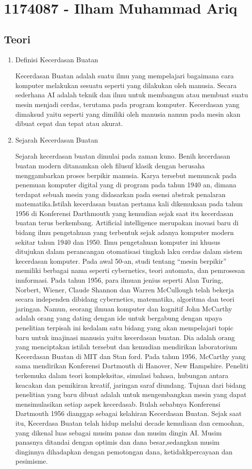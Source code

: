 \section{1174087 - Ilham Muhammad Ariq}
\subsection{Teori}
\begin{enumerate}
	\item Definisi Kecerdasan Buatan
		\par Kecerdasan Buatan adalah suatu ilmu yang mempelajari bagaimana cara komputer melakukan sesuatu seperti yang dilakukan oleh manusia. Secara sederhana AI adalah teknik dan ilmu untuk membangun atau membuat suatu mesin menjadi cerdas, terutama pada program komputer. Kecerdasan yang dimaksud yaitu seperti yang dimiliki oleh manusia namun pada mesin akan dibuat cepat dan tepat atau akurat.

\item Sejarah Kecerdasan Buatan
	\par Sejarah kecerdasan buatan dimulai pada zaman kuno. Benih kecerdasan buatan modern ditanamkan oleh filusuf klasik dengan berusaha menggambarkan proses berpikir manusia. Karya tersebut memuncak pada penemuan komputer digital yang di program pada tahun 1940 an, dimana terdapat sebuah mesin yang didasarkan pada esensi abstrak penalaran matematika.Istilah kecerdasan buatan pertama kali dikemukaan pada tahun 1956 di Konferensi Darthmouth yang kemudian sejak saat itu kecerdasan buatan terus berkembang. Artiﬁcial intelligence merupakan inovasi baru di bidang ilmu pengetahuan yang terbentuk sejak adanya komputer modern sekitar tahun 1940 dan 1950. Ilmu pengetahuan komputer ini khusus ditujukan dalam perancangan otomatisasi tingkah laku cerdas dalam sistem kecerdasan komputer. Pada awal 50-an, studi tentang “mesin berpikir” memiliki berbagai nama seperti cybernetics, teori automata, dan pemrosesan innformasi. Pada tahun 1956, para ilmuan jenius seperti Alan Turing, Norbert, Wiener, Claude Shannon dan Warren McCullough telah bekerja secara independen dibidang cybernetics, matematika, algoritma dan teori jaringan. Namun, seorang ilmuan komputer dan kognitif John McCarthy adalah orang yang dating dengan ide untuk bergabung dengan upaya penelitian terpisah ini kedalam satu bidang yang akan mempelajari topic baru untuk imajinasi manusia yaitu kecerdasan buatan. Dia adalah orang yang menciptakan istilah tersebut dan kemudian mendirikan laboratorium Kecerdasan Buatan di MIT dan Stan ford. Pada tahun 1956, McCarthy yang sama mendirikan Konferensi Dartmouth di Hanover, New Hampshire. Peneliti terkemuka dalam teori kompleksitas, simulasi bahasa, hubungan antara keacakan dan pemikiran kreatif, jaringan saraf diundang. Tujuan dari bidang penelitian yang baru dibuat adalah untuk mengembangkan mesin yang dapat mensimulasikan setiap aspek kecerdasab. Itulah sebabnya Konferensi Dartmouth 1956 dianggap sebagai kelahiran Kecerdasan Buatan. Sejak saat itu, Kecerdasa Buatan telah hidup melalui decade kemuliaan dan cemoohan, yang dikenal luas sebagai musim panas dan musim dingin AI. Musim panasnya ditandai dengan optimis dan dana besar,sedangkan musim dinginnya dihadapkan dengan pemotongan dana, ketidakkpercayaan dan pesimisme.


\end{enumerate}
